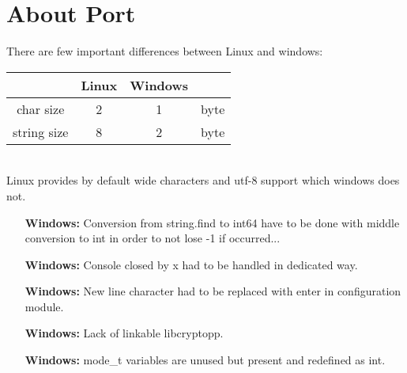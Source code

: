 \hypertarget{AboutPort}{
\section{About Port}
\label{AboutPort}
}

There are few important differences between Linux and windows:\\
\begin{tabular}{|c|c|c|c|}
\hline
  & Linux & Windows & \\ \hline
char size & 2 & 1 & byte\\ \hline
string size & 8 & 2 & byte\\ \hline
\end{tabular}\\
Linux provides by default wide characters and utf-8 support which windows does not.
\begin{itemize}
\item [\textbf{Windows:}]Conversion from string.find to int64 have to be done with middle conversion to int in order to not lose -1 if occurred...
\item [\textbf{Windows:}]Console closed by x had to be handled in dedicated way.
\item [\textbf{Windows:}]New line character had to be replaced with enter in configuration module.
\item [\textbf{Windows:}]Lack of linkable libcryptopp.
\item [\textbf{Windows:}]mode\_t variables are unused but present and redefined as int.
\end{itemize}
